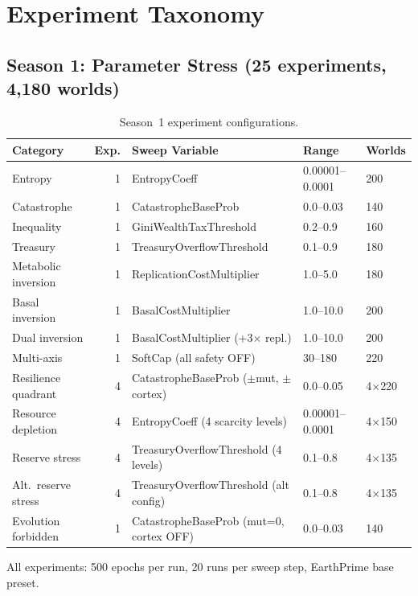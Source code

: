 \documentclass[11pt,a4paper]{article}
\begin{document}
\section{Experiment Taxonomy}

\subsection{Season 1: Parameter Stress (25 experiments, 4,180 worlds)}

\begin{table}[H]
\centering
\caption{Season~1 experiment configurations.}
\small
\begin{tabular}{@{}lrlll@{}}
\toprule
Category & Exp. & Sweep Variable & Range & Worlds \\
\midrule
Entropy & 1 & EntropyCoeff & 0.00001--0.0001 & 200 \\
Catastrophe & 1 & CatastropheBaseProb & 0.0--0.03 & 140 \\
Inequality & 1 & GiniWealthTaxThreshold & 0.2--0.9 & 160 \\
Treasury & 1 & TreasuryOverflowThreshold & 0.1--0.9 & 180 \\
Metabolic inversion & 1 & ReplicationCostMultiplier & 1.0--5.0 & 180 \\
Basal inversion & 1 & BasalCostMultiplier & 1.0--10.0 & 200 \\
Dual inversion & 1 & BasalCostMultiplier (+3$\times$ repl.) & 1.0--10.0 & 200 \\
Multi-axis & 1 & SoftCap (all safety OFF) & 30--180 & 220 \\
Resilience quadrant & 4 & CatastropheBaseProb ($\pm$mut, $\pm$cortex) & 0.0--0.05 & 4$\times$220 \\
Resource depletion & 4 & EntropyCoeff (4 scarcity levels) & 0.00001--0.0001 & 4$\times$150 \\
Reserve stress & 4 & TreasuryOverflowThreshold (4 levels) & 0.1--0.8 & 4$\times$135 \\
Alt.\ reserve stress & 4 & TreasuryOverflowThreshold (alt config) & 0.1--0.8 & 4$\times$135 \\
Evolution forbidden & 1 & CatastropheBaseProb (mut=0, cortex OFF) & 0.0--0.03 & 140 \\
\bottomrule
\end{tabular}
\end{table}

All experiments: 500 epochs per run, 20 runs per sweep step, EarthPrime base preset.
\end{document}
